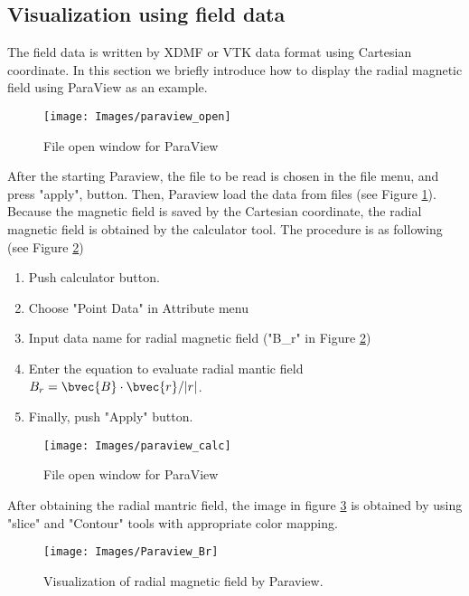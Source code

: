 \subsection{Visualization using field data}
\label{sec:paraview}
The field data is written by XDMF or VTK data format using Cartesian coordinate. In this section we briefly introduce how to display the radial magnetic field using ParaView as an example.
%
\begin{figure}[htbp]
\begin{center}
\texttt{[image: Images/paraview\_open]}
\caption{File open window for ParaView}
\label{fig:paraview_load}
\end{center}
\end{figure}
%

After the starting Paraview, the file to be read is chosen in the file menu, and press "apply", button. Then, Paraview load the data from files (see Figure \ref{fig:paraview_load}). 
Because the magnetic field is saved by the Cartesian coordinate, the radial magnetic field is obtained by the calculator tool. The procedure is as following (see Figure \ref{fig:paraview_gen_Br})
%
\begin{enumerate}
\item Push calculator button.
\item Choose "Point Data" in Attribute menu
\item Input data name for radial magnetic field ("B\_r" in  Figure \ref{fig:paraview_gen_Br})
\item Enter the equation to evaluate radial mantic field $B_{r} = \bvec{B} \cdot \bvec{r} / |r|$.
\item Finally, push "Apply" button.
\end{enumerate}
%
%
\begin{figure}[htbp]
\begin{center}
\texttt{[image: Images/paraview\_calc]}
\caption{File open window for ParaView}
\label{fig:paraview_gen_Br}
\end{center}
\end{figure}
%
After obtaining the radial mantric field, the image in figure \ref{fig:paraview_br} is obtained by using "slice" and  "Contour" tools with appropriate color mapping.
%
\begin{figure}[htbp]
\begin{center}
\texttt{[image: Images/Paraview\_Br]}
\end{center}
\caption{Visualization of radial magnetic field by Paraview.}
\label{fig:paraview_br}
\end{figure}
%

